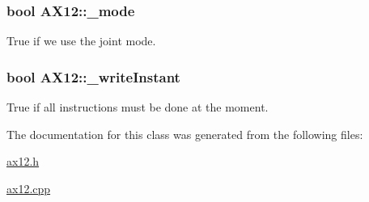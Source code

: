 \subsubsection[{\+\_\+mode}]{\setlength{\rightskip}{0pt plus 5cm}bool A\+X12\+::\+\_\+mode\hspace{0.3cm}{\ttfamily [private]}}\label{class_a_x12_a2fd07e2e636003227a32d09d211bd6d4}


True if we use the joint mode. 

\hypertarget{class_a_x12_aeb6e6414fe4a02d77a1d84d5213800e2}{}
\subsubsection[{\+\_\+write\+Instant}]{\setlength{\rightskip}{0pt plus 5cm}bool A\+X12\+::\+\_\+write\+Instant\hspace{0.3cm}{\ttfamily [private]}}\label{class_a_x12_aeb6e6414fe4a02d77a1d84d5213800e2}


True if all instructions must be done at the moment. 



The documentation for this class was generated from the following files\+:\begin{DoxyCompactItemize}
\item 
\hyperlink{ax12_8h}{ax12.\+h}\item 
\hyperlink{ax12_8cpp}{ax12.\+cpp}\end{DoxyCompactItemize}
